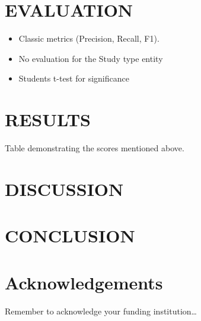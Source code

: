 \documentclass[10.7pt,]{article}
\begin{document}
\section{EVALUATION}\label{eval}
\begin{itemize}
    \item Classic metrics (Precision, Recall, F1).
    \item No evaluation for the Study type entity
    \item Students t-test for significance
\end{itemize}
%
%
%
\section{RESULTS}\label{results}
Table demonstrating the scores mentioned above.
%
%
%
\section{DISCUSSION}\label{discussion}
\lipsum[3-4]
%
%
%
\section{CONCLUSION}\label{conclusion}
\lipsum[3-4]
%
%
%
\section{Acknowledgements}\label{acknowledgements}
Remember to acknowledge your funding institution\ldots
%
%
%


\end{document}
